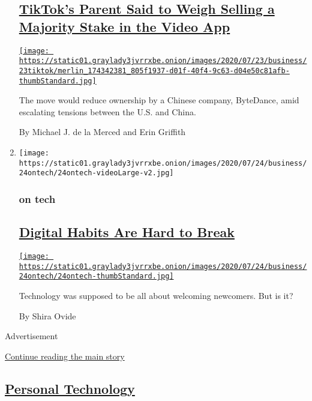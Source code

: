 \begin{enumerate}
{  \subsection{\texorpdfstring{\href{/2020/07/23/business/dealbook/tiktok-bytedance-investors-trump.html}{TikTok's
  Parent Said to Weigh Selling a Majority Stake in the Video
  App}}{TikTok's Parent Said to Weigh Selling a Majority Stake in the Video App}}\label{tiktoks-parent-said-to-weigh-selling-a-majority-stake-in-the-video-app}}

  \href{/2020/07/23/business/dealbook/tiktok-bytedance-investors-trump.html}{\texttt{[image: https://static01.graylady3jvrrxbe.onion/images/2020/07/23/business/23tiktok/merlin\_174342381\_805f1937-d01f-40f4-9c63-d04e50c81afb-thumbStandard.jpg]}}

  The move would reduce ownership by a Chinese company, ByteDance, amid
  escalating tensions between the U.S. and China.

  By Michael J. de la Merced and Erin Griffith
\item
  \texttt{[image: https://static01.graylady3jvrrxbe.onion/images/2020/07/24/business/24ontech/24ontech-videoLarge-v2.jpg]}

  \hypertarget{on-tech}{%
  \subsubsection{on tech}\label{on-tech}}

  \hypertarget{digital-habits-are-hard-to-break}{%
  \subsection{\texorpdfstring{\href{/2020/07/24/technology/digital-habits.html}{Digital
  Habits Are Hard to
  Break}}{Digital Habits Are Hard to Break}}\label{digital-habits-are-hard-to-break}}

  \href{/2020/07/24/technology/digital-habits.html}{\texttt{[image: https://static01.graylady3jvrrxbe.onion/images/2020/07/24/business/24ontech/24ontech-thumbStandard.jpg]}}

  Technology was supposed to be all about welcoming newcomers. But is
  it?

  By Shira Ovide
\end{enumerate}

Advertisement

\protect\hyperlink{after-mid1}{Continue reading the main story}

\hypertarget{personal-technology}{%
\subsection{\texorpdfstring{\href{/section/technology/personaltech}{Personal
Technology}}{Personal Technology}}\label{personal-technology}}

